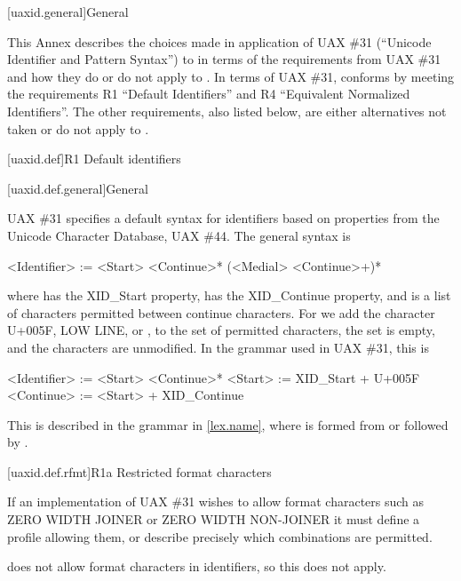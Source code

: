 
[uaxid.general]{General}

\pnum
This Annex describes the choices made in application of
UAX \#31 (``Unicode Identifier and Pattern Syntax'')
to \Cpp{} in terms of the requirements from UAX \#31 and
how they do or do not apply to \Cpp{}.
In terms of UAX \#31,
\Cpp{} conforms by meeting the requirements
R1 ``Default Identifiers'' and
R4 ``Equivalent Normalized Identifiers''.
The other requirements, also listed below,
are either alternatives not taken or do not apply to \Cpp{}.

[uaxid.def]{R1 Default identifiers}

[uaxid.def.general]{General}

\pnum
UAX \#31 specifies a default syntax for identifiers
based on properties from the Unicode Character Database, UAX \#44.
The general syntax is
\begin{outputblock}
<Identifier> := <Start> <Continue>* (<Medial> <Continue>+)*
\end{outputblock}
where  has the XID_Start property,
 has the XID_Continue property, and
 is a list of characters permitted between continue characters.
For \Cpp{} we add the character U+005F, LOW LINE, or \tcode{_},
to the set of permitted  characters,
the  set is empty, and
the  characters are unmodified.
In the grammar used in UAX \#31, this is
\begin{outputblock}
<Identifier> := <Start> <Continue>*
<Start> := XID_Start + U+005F
<Continue> := <Start> + XID_Continue
\end{outputblock}

\pnum
This is described in the \Cpp{} grammar in \ref{lex.name},
where  is formed from
 or
 followed by .

[uaxid.def.rfmt]{R1a Restricted format characters}

\pnum
If an implementation of UAX \#31 wishes to allow format characters
such as ZERO WIDTH JOINER or ZERO WIDTH NON-JOINER
it must define a profile allowing them, or
describe precisely which combinations are permitted.

\pnum
\Cpp{} does not allow format characters in identifiers, so this does not apply.

